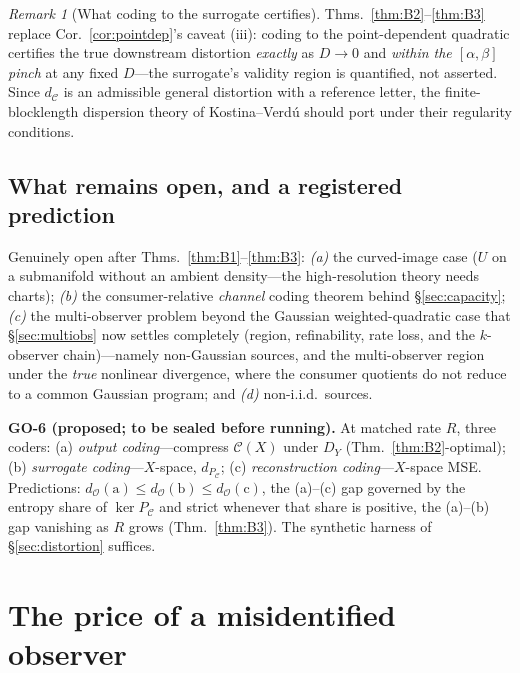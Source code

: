 \documentclass[lettersize,onecolumn]{IEEEtran}
\theoremstyle{definition}
\theoremstyle{remark}
\newtheorem*{remark}{Remark}
\newcommand{\PC}{P_{\mathcal{C}}}
\newcommand{\dO}{d_{\mathcal{O}}}
\begin{document}
\begin{remark}[What coding to the surrogate certifies]
Thms.~\ref{thm:B2}--\ref{thm:B3} replace Cor.~\ref{cor:pointdep}'s caveat (iii): coding
to the point-dependent quadratic certifies the true downstream distortion \emph{exactly}
as $D\to0$ and \emph{within the $[\alpha,\beta]$ pinch} at any fixed $D$---the
surrogate's validity region is quantified, not asserted. Since $d_{\mathcal{C}}$ is an
admissible general distortion with a reference letter, the finite-blocklength dispersion
theory of Kostina--Verd\'u \cite{kostinaverdu2012} should port under their regularity
conditions.
\end{remark}

\subsection{What remains open, and a registered prediction}\label{subsec:open}

Genuinely open after Thms.~\ref{thm:B1}--\ref{thm:B3}: \emph{(a)} the curved-image case
($U$ on a submanifold without an ambient density---the high-resolution theory needs
charts); \emph{(b)} the consumer-relative \emph{channel} coding theorem behind
\S\ref{sec:capacity}; \emph{(c)} the multi-observer problem beyond the Gaussian weighted-quadratic case that
\S\ref{sec:multiobs} now settles completely (region, refinability, rate loss, and the
$k$-observer chain)---namely non-Gaussian sources, and the multi-observer region under the
\emph{true} nonlinear divergence, where the consumer quotients do not reduce to a common
Gaussian program; and
\emph{(d)} non-i.i.d.\ sources.

\smallskip\noindent\textbf{GO-6 (proposed; to be sealed before running).} At matched
rate $R$, three coders: (a) \emph{output coding}---compress $\mathcal{C}(X)$ under $D_Y$
(Thm.~\ref{thm:B2}-optimal); (b) \emph{surrogate coding}---$X$-space, $d_{\PC}$;
(c) \emph{reconstruction coding}---$X$-space MSE. Predictions:
$\dO(\mathrm a)\le\dO(\mathrm b)\le\dO(\mathrm c)$, the (a)--(c) gap governed by the
entropy share of $\ker\PC$ and strict whenever that share is positive, the (a)--(b) gap
vanishing as $R$ grows (Thm.~\ref{thm:B3}). The synthetic harness of
\S\ref{sec:distortion} suffices.

\section{The price of a misidentified observer}\label{app:mismatch}
\end{document}
